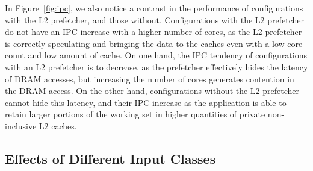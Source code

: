 \documentclass[AMA,final,STIX1COL]{WileyNJD-v2}
\newcommand{\ms}[1]{\textcolor{orange}{\bfseries \ul{ msserpa: #1} }\vspace{0.2cm}}
\begin{document}
% 

In Figure~\ref{fig:ipc}, we also notice a contrast in the performance of configurations with the L2 prefetcher, and those without.
Configurations with the L2 prefetcher do not have an IPC increase with a higher number of cores, as the L2 prefetcher is correctly speculating and bringing the data to the caches even with a low core count and low amount of cache.
On one hand, the IPC tendency of configurations with an L2 prefetcher is to decrease, as the prefetcher effectively hides the latency of DRAM accesses, but increasing the number of cores generates contention in the DRAM access.
On the other hand, configurations without the L2 prefetcher cannot hide this latency, and their IPC increase as the application is able to retain larger portions of the working set in higher quantities of private non-inclusive L2 caches.






\subsection{Effects of Different Input Classes}
\label{subs:NAS_WAB}
\end{document}
